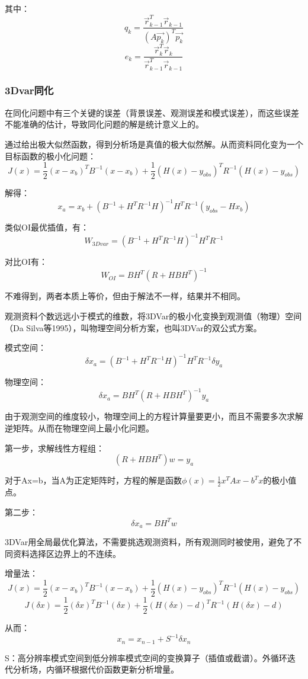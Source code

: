 \documentclass{article}
\begin{document}
其中：
$$q_k = \frac{\vec{r}_{k-1}^T\vec{r}_{k-1}}{(A\vec{p_k})^T\vec{p_k}}$$
$$e_k = \frac{\vec{r}_{k}^T\vec{r}_{k}}{\vec{r}_{k-1}^T\vec{r}_{k-1}}$$

\subsubsection{3Dvar同化}

在同化问题中有三个关键的误差（背景误差、观测误差和模式误差），而这些误差不能准确的估计，导致同化问题的解是统计意义上的。

通过给出极大似然函数，得到分析场是真值的极大似然解。从而资料同化变为一个目标函数的极小化问题：
$$J(x) = \frac{1}{2}(x-x_b)^{T}B^{-1}(x-x_b) + \frac{1}{2}(H(x)-y_{obs})^{T}R^{-1}(H(x)-y_{obs})$$

解得：
$$x_a = x_b + (B^{-1} + H^TR^{-1}H)^{-1}H^TR^{-1}(y_{obs} - Hx_b)$$

类似OI最优插值，有：
$$W_{3Dvar} = (B^{-1} + H^TR^{-1}H)^{-1}H^TR^{-1}$$

对比OI有：
$$W_{OI} = BH^T(R + HBH^T)^{-1}$$

不难得到，两者本质上等价，但由于解法不一样，结果并不相同。

观测资料个数远远小于模式的维数，将3DVar的极小化变换到观测值（物理）空间（Da Silva等1995），叫物理空间分析方案，也叫3DVar的双公式方案。

模式空间：
$$\delta x_a=(B^{-1} + H^TR^{-1}H)^{-1}H^TR^{-1}\delta y_a$$

物理空间：
$$\delta x_a = BH^T(R + HBH^T)^{-1}y_a$$

由于观测空间的维度较小，物理空间上的方程计算量要更小，而且不需要多次求解逆矩阵。从而在物理空间上最小化问题。

第一步，求解线性方程组：
$$(R + HBH^T)w = y_a$$

对于Ax=b，当A为正定矩阵时，方程的解是函数$\phi(x) = \frac{1}{2}x^TAx - b^Tx$的极小值点。

第二步：
$$\delta x_a = BH^T w$$

3DVar用全局最优化算法，不需要挑选观测资料，所有观测同时被使用，避免了不同资料选择区边界上的不连续。

增量法：
$$J(x) = \frac{1}{2}(x-x_b)^{T}B^{-1}(x-x_b) + \frac{1}{2}(H(x)-y_{obs})^{T}R^{-1}(H(x)-y_{obs})$$
$$J(\delta x) = \frac{1}{2}(\delta x)^{T}B^{-1}(\delta x) + \frac{1}{2}(H(\delta x)-d)^{T}R^{-1}(H(\delta x)-d)$$

从而：
$$x_n = x_{n-1} + S^{-1}\delta x_n$$

S：高分辨率模式空间到低分辨率模式空间的变换算子（插值或截谱）。外循环迭代分析场，内循环根据代价函数更新分析增量。
\end{document}

